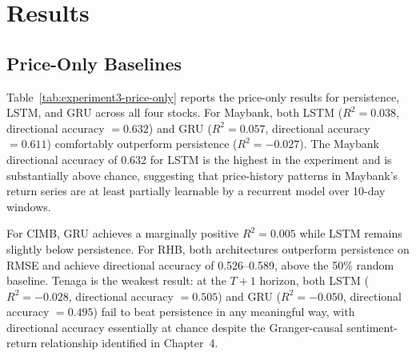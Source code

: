 \documentclass[12pt]{ucetd}
\begin{document}
\section{Results}

\subsection{Price-Only Baselines}

Table~\ref{tab:experiment3-price-only} reports the price-only results for persistence, LSTM, and GRU across all four stocks. For Maybank, both LSTM ($R^2 = 0.038$, directional accuracy $= 0.632$) and GRU ($R^2 = 0.057$, directional accuracy $= 0.611$) comfortably outperform persistence ($R^2 = -0.027$). The Maybank directional accuracy of 0.632 for LSTM is the highest in the experiment and is substantially above chance, suggesting that price-history patterns in Maybank's return series are at least partially learnable by a recurrent model over 10-day windows.

For CIMB, GRU achieves a marginally positive $R^2 = 0.005$ while LSTM remains slightly below persistence. For RHB, both architectures outperform persistence on RMSE and achieve directional accuracy of 0.526--0.589, above the 50\% random baseline. Tenaga is the weakest result: at the $T{+}1$ horizon, both LSTM ($R^2 = -0.028$, directional accuracy $= 0.505$) and GRU ($R^2 = -0.050$, directional accuracy $= 0.495$) fail to beat persistence in any meaningful way, with directional accuracy essentially at chance despite the Granger-causal sentiment-return relationship identified in Chapter~4.
\end{document}
